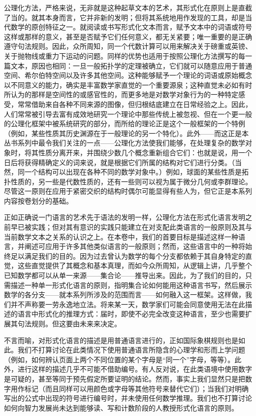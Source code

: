 公理化方法，严格来说，无非就是这种起草文本的艺术，其形式化在原则上是直截了当的。就其本身而言，它并非新的发明；但将其系统地用作发现的工具，却是当代数学的原创特征之一。就阅读或书写形式化文本而言，赋予文本中的词语或符号这样或那样的意义，甚至是否赋予它们任何意义，都无关紧要；唯一重要的是正确遵守句法规则。因此，众所周知，同一个代数计算可以用来解决关于磅重或英镑、关于抛物线或重力下运动的问题。同样的优势也适用于按照公理化方法撰写的每一篇文本，原因也相同：一旦一般拓扑学的定理被确立，它们就可以随意应用于普通空间、希尔伯特空间以及许多其他空间。这种能够赋予一个理论的词语或原始概念以不同意义的能力，确实是丰富数学家直觉的一个重要源泉；这种直觉未必如有时所认为的那样是空间性的或感官性的，而更多地是对数学对象行为的一种特定感受，常常借助来自各种不同来源的图像，但归根结底建立在日常经验之上。因此，人们常常被引导去富有成效地研究一个理论中那些传统上被忽视、但在一个更一般的公理化框架中被系统研究的部分，而所给的理论正是这个一般框架的一个特例（例如，某些性质其历史渊源在于一般理论的另一个特化）。此外——而这正是本丛书系列中最令我们关注的一点——公理化方法使我们能够，在处理复杂的数学对象时，将其性质分离开来，并围绕少数几个概念重新组合它们：也就是说，用一个日后将获得精确定义的词来说，就是根据它们所属的结构对它们进行分类。（当然，同一个结构可以出现在各种不同的数学对象中。）例如，球面的某些性质是拓扑性质的，另一些是代数性质的，还有一些则可以视为属于微分几何或李群理论。尽管这一原则在应用于紧密交织的结构时偶尔可能显得有些人为，但它正是本系列内容按卷划分的基础。

正如正确说一门语言的艺术先于语法的发明一样，公理化方法在形式化语言发明之前早已被实践；但对其有意识的实践只能建立在对支配此类语言的一般原则及其与当前数学文本之关系的认识之上。在本卷中，我们的首要目标是描述这样一种语言，并阐述可应用于许多其他类似语言的一般原则；然而，这些语言中的一种将始终足以满足我们的目的。因为过去曾认为数学的每个分支都依赖于其自身特定的直觉，这些直觉提供了其概念和基本真理，而如今众所周知，从逻辑上讲，几乎整个已知数学都可以从单一来源——集合论——推导出来。因此，为了我们的目的，只需描述一种单一形式化语言的原则，指明集合论如何能用这种语言书写，然后展示数学的各分支——就本系列所涉及的范围而言——如何融入这一框架。这样做，我们并不声称要一劳永逸地立法。将来某一天，数学家们可能会同意使用无法在此描述的语言中形式化的推理方式：届时，即使不必完全改变这种语言，至少也需要扩展其句法规则。但这要由未来来决定。

不言而喻，对形式化语言的描述是用普通语言进行的，正如国际象棋规则也是如此。我们不打算讨论在此类情况下使用普通语言所隐含的心理学和形而上学问题（例如，如何辨认页面上两个不同位置的某个字母是“同一个”字母，等等）。此外，进行这样的描述几乎不可能不借助编号。有人反对说，在此类语境中使用数字是可疑的，甚至等同于预先假定所要证明的结论。然而，事实上我们显然只是把数字用作标记（而且同样可以用颜色或字母等其他符号来替代它们）；当我们对明确写出的公式中出现的符号进行编号时，并未使用任何数学推理。我们也不打算讨论如何向智力发展尚未达到能够读、写和计数阶段的人教授形式化语言的原则。

